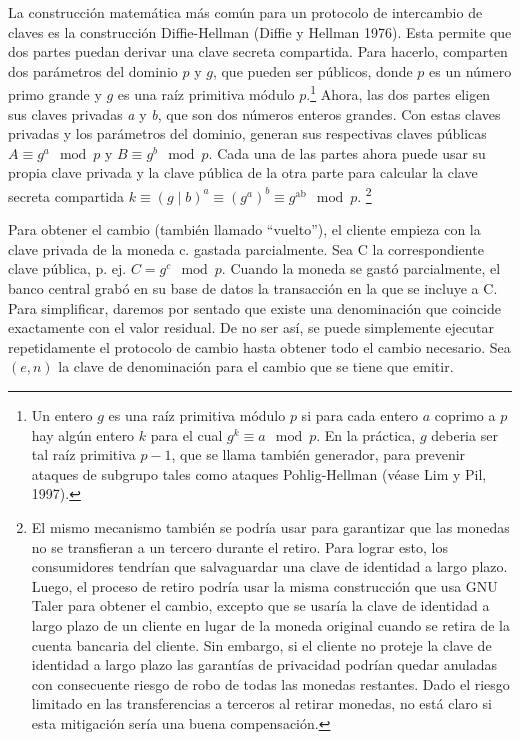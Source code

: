\documentclass[10pt,spanish]{article}
\begin{document}
La construcción matemática más común para un protocolo de intercambio de
claves es la construcción Diffie-Hellman (Diffie y Hellman 1976). Esta
permite que dos partes puedan derivar una clave secreta compartida. Para
hacerlo, comparten dos parámetros del dominio $p$ y $g$, que
pueden ser públicos, donde $p$ es un número primo grande y $g$
es una raíz primitiva módulo $p$.\footnote{Un entero $g$ es una raíz
primitiva módulo $p$ si para cada entero $a$ coprimo a $p$ hay
algún entero $k$ para el cual
$g^k \equiv a \mod p$.
En la práctica, $g$ deberia ser tal raíz primitiva $p-1$, que se
llama también generador, para prevenir ataques de subgrupo tales como ataques
Pohlig-Hellman (véase Lim y Pil, 1997).} Ahora, las dos partes eligen sus claves
privadas \emph{a} y \emph{b}, que son dos números enteros grandes. Con estas claves
privadas y los parámetros del dominio, generan sus respectivas claves
públicas $A \equiv g^{a} \mod p$ y $B \equiv g^{b} \mod p$.
Cada una de las partes ahora puede usar su propia clave privada y la
clave pública de la otra parte para calcular la clave secreta compartida
$k \equiv \left( g \middle| b \right)^{a} \equiv \left( g^{a} \right)^{b} \equiv g^{\text{ab}} \mod p$.
\footnote{El mismo mecanismo también se podría usar para garantizar que
las monedas no se transfieran a un tercero durante el retiro. Para
lograr esto, los consumidores tendrían que salvaguardar una clave de
identidad a largo plazo. Luego, el proceso de retiro podría usar la
misma construcción que usa GNU Taler para obtener el cambio, excepto
que se usaría la clave de identidad a largo plazo de un cliente en
lugar de la moneda original cuando se retira de la cuenta bancaria del
cliente. Sin embargo, si el cliente no proteje la clave de identidad a
largo plazo las garantías de privacidad podrían quedar anuladas con
consecuente riesgo de robo de todas las monedas restantes. Dado el
riesgo limitado en las transferencias a terceros al retirar monedas,
no está claro si esta mitigación sería una buena compensación.}

Para obtener el cambio (también llamado ``vuelto''), el cliente empieza
con la clave privada de la moneda c. gastada parcialmente. Sea C la
correspondiente clave pública, p. ej.
$C = g^{c} \mod p$.
Cuando la moneda se gastó parcialmente, el banco central grabó en su base de
datos la transacción en la que se incluye a C. Para simplificar, daremos
por sentado que existe una denominación que coincide exactamente con el
valor residual. De no ser así, se puede simplemente ejecutar
repetidamente el protocolo de cambio hasta obtener todo el cambio
necesario. Sea $(e,n)$ la clave de denominación para el
cambio que se tiene que emitir.
\end{document}
